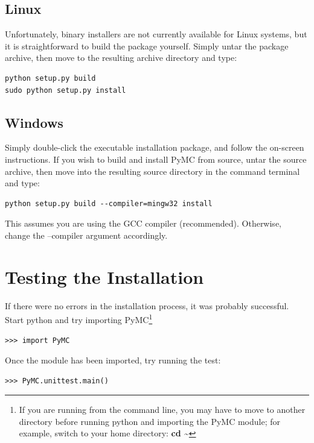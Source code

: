 \documentclass[]{book}
\begin{document}
\subsection{Linux}

Unfortunately, binary installers are not currently available for Linux systems, but it is straightforward to build the package yourself. Simply untar the package archive, then move to the resulting archive directory and type:
\begin{verbatim}
python setup.py build
sudo python setup.py install
\end{verbatim}

\subsection{Windows}

Simply double-click the executable installation package, and follow the on-screen instructions.
If you wish to build and install PyMC from source, untar the source archive, then move into the resulting source directory in the command terminal and type:
\begin{verbatim}
python setup.py build --compiler=mingw32 install
\end{verbatim}
This assumes you are using the GCC compiler (recommended). Otherwise, change the --compiler argument accordingly.

\section{Testing the Installation}

If there were no errors in the installation process, it was probably successful. Start python and try importing PyMC\footnote{If you are running from the command line, you may have to move to another directory before running python and importing the PyMC module; for example, switch to your home directory: \textbf{cd \textasciitilde}}
\begin{verbatim}
>>> import PyMC
\end{verbatim}
Once the module has been imported, try running the test:
\begin{verbatim}
>>> PyMC.unittest.main()
\end{verbatim}
\end{document}
